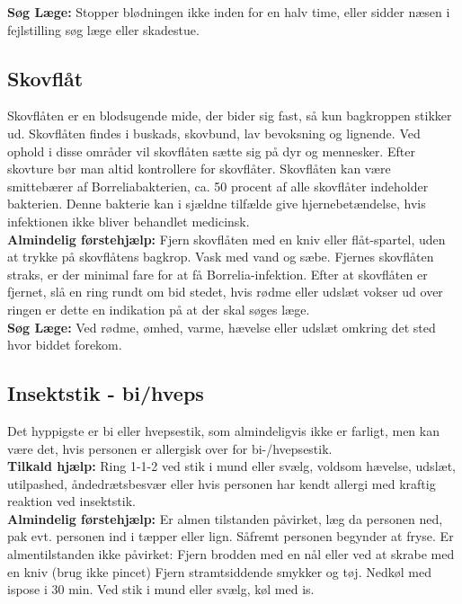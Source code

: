 \documentclass[../../../main.tex]{subfiles}
\begin{document}
\begin{multicols}{2}
\textbf{Søg Læge:} Stopper blødningen ikke inden for en halv time, eller sidder næsen i fejlstilling søg læge eller skadestue.
\\
\subsection*{Skovflåt} Skovflåten er en blodsugende mide, der bider sig fast, så kun bagkroppen stikker ud. Skovflåten findes i buskads, skovbund, lav
bevoksning og lignende. Ved ophold i disse områder vil skovflåten sætte sig
på dyr og mennesker. Efter skovture bør man altid kontrollere for skovflåter.
Skovflåten kan være smittebærer af Borreliabakterien, ca. 50 procent af alle skovflåter indeholder bakterien. Denne bakterie kan i sjældne tilfælde give
hjernebetændelse, hvis infektionen ikke bliver behandlet medicinsk.
\\

\textbf{Almindelig førstehjælp:} Fjern skovflåten med en kniv eller flåt-spartel, uden at trykke på skovflåtens bagkrop. Vask med vand og sæbe. Fjernes skovflåten straks, er der minimal fare for at få Borrelia-infektion. Efter at skovflåten er fjernet, slå en ring rundt om bid stedet, hvis rødme eller udslæt vokser ud over ringen er dette en indikation på at der skal søges læge.
\\

\textbf{Søg Læge:} Ved rødme, ømhed, varme, hævelse eller udslæt omkring det sted hvor biddet forekom.
\\

\subsection*{Insektstik - bi/hveps} Det hyppigste er bi eller hvepsestik, som almindeligvis ikke er farligt, men kan være det, hvis personen er allergisk over for bi-/hvepsestik.
\\

\textbf{Tilkald hjælp:} Ring 1-1-2 ved stik i mund eller svælg, voldsom hævelse, udslæt, utilpashed, åndedrætsbesvær eller hvis personen har kendt allergi med kraftig reaktion ved insektstik.
\\

\textbf{Almindelig førstehjælp:} Er almen tilstanden påvirket, læg da personen ned, pak evt. personen ind i tæpper eller lign. Såfremt personen begynder at fryse. Er almentilstanden ikke påvirket: Fjern brodden med en nål eller ved at skrabe med en kniv (brug ikke pincet) Fjern stramtsiddende smykker og tøj. Nedkøl med ispose i 30 min. Ved stik i mund eller svælg, køl med is.
\\


\end{multicols}
\end{document}
